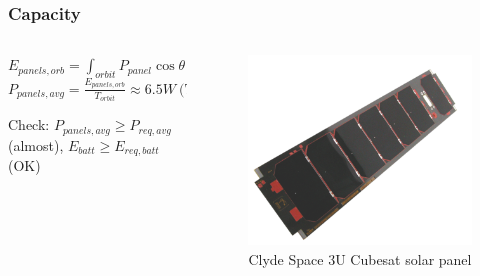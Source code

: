 \documentclass{beamer}
\begin{document}
\begin{frame}
	\frametitle{Capacity}
	\begin{columns}
	\begin{column}{0.5\textwidth}
	$ \displaystyle E_{panels,orb} = \int_{orbit}{P_{panel}\cos\theta \ dt } $
	\newline
	\newline
	$ \displaystyle P_{panels,avg} = \frac{E_{panels,orb}}{T_{orbit}} \approx 6.5 W \ \text{(TBR w/ STK)}$
	
	\begin{center}
	Check: $P_{panels,avg} \geq P_{req,avg}$ (almost), $E_{batt} \geq E_{req,batt}$	(OK)
	\end{center}
	
	\end{column}
	
	\begin{column}{0.5\textwidth}
	
	\begin{figure}%
	\includegraphics[width=\columnwidth]{Panel}%
	\caption{Clyde Space 3U Cubesat solar panel}%
	\label{}%
	\end{figure}
	\end{column}
	
	\end{columns}
	
\end{frame}
\end{document}
